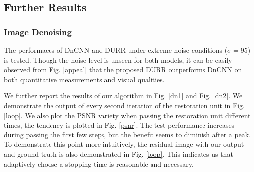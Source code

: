 \documentclass{article} %
\begin{document}
\subsection{Further Results}

\subsubsection{Image Denoising}

The performaces of DnCNN and DURR under extreme noise conditions ($\sigma=95$)
is tested. Though the noise level is unseen for both models, it can be easily
observed from Fig. \ref{appeal} that the proposed DURR outperforms DnCNN
on both quantitative measurements and visual qualities.

We further report the results of our algorithm in Fig. \ref{dn1} and Fig. \ref{dn2}.
We demonstrate the output of every second iteration of the restoration unit in Fig. \ref{loop}.
We also plot the PSNR variety when passing the restoration unit different times,
the tendency is plotted in Fig. \ref{psnr}.
The test performance increases during passing the first few steps,
but the benefit seems to diminish after a peak. To demonstrate this point
more intuitively, the residual image with our output and ground truth
is also demonstrated in Fig. \ref{loop}. This indicates us that adaptively
choose a stopping time is reasonable and necessary.
\end{document}
